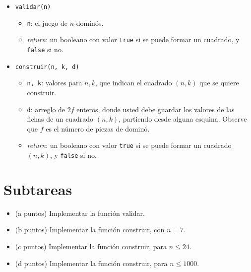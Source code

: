 \documentclass{article}
\begin{document}
\begin{itemize}
 \item \verb+validar(n)+
 \begin{itemize}
  \item \verb+n+: el juego de $n$-dominós.
  \item \emph{return}: un booleano con valor \verb+true+ si se puede formar un cuadrado, y \verb+false+ si no.
 \end{itemize}

 \item \verb+construir(n, k, d)+
 \begin{itemize}
  \item \verb+n, k+: valores para $n,k$, que indican el cuadrado $(n,k)$ que se quiere construir.
  \item \verb+d+: arreglo de $2f$ enteros, donde usted debe guardar los valores de las fichas de un cuadrado $(n,k)$, partiendo desde alguna esquina. Observe que $f$ es el número de piezas de dominó. %
  \item \emph{return}: un booleano con valor \verb+true+ si se puede formar un cuadrado $(n,k)$, y \verb+false+ si no.
 \end{itemize}
\end{itemize}

\section*{Subtareas}
\begin{itemize}
  \item (a puntos) Implementar la función validar.
  \item (b puntos) Implementar la función construir, con $n=7$.
  \item (c puntos) Implementar la función construir, para $n \le 24$.
  \item (d puntos) Implementar la función construir, para $n \le 1000$.
\end{itemize}


\end{document}
